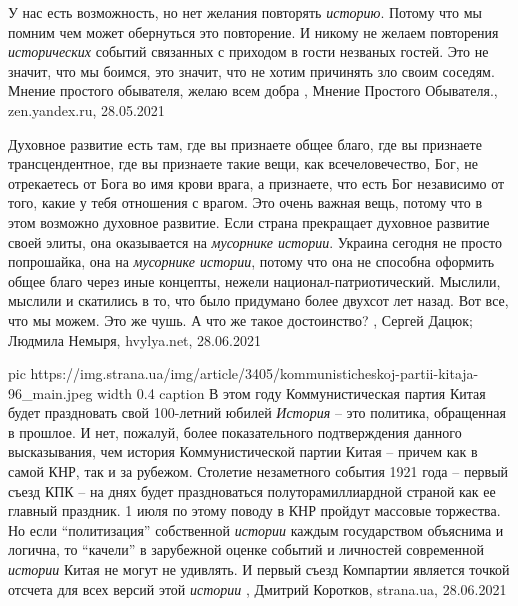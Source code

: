У нас есть возможность, но нет желания повторять \emph{историю}. Потому что мы помним
чем может обернуться это повторение. И никому не желаем повторения \emph{исторических}
событий связанных с приходом в гости незваных гостей. Это не значит, что мы
боимся, это значит, что не хотим причинять зло своим соседям.  Мнение простого
обывателя, желаю всем добра
, 
Мнение Простого Обывателя., zen.yandex.ru, 28.05.2021


Духовное развитие есть там, где вы признаете общее благо, где вы признаете
трансцендентное, где вы признаете такие вещи, как всечеловечество, Бог, не
отрекаетесь от Бога во имя крови врага, а признаете, что есть Бог независимо от
того, какие у тебя отношения с врагом. Это очень важная вещь, потому что в этом
возможно духовное развитие. Если страна прекращает духовное развитие своей
элиты, она оказывается на \emph{мусорнике истории}.  Украина сегодня не просто
попрошайка, она на \emph{мусорнике истории}, потому что она не способна оформить общее
благо через иные концепты, нежели национал-патриотический. Мыслили, мыслили и
скатились в то, что было придумано более двухсот лет назад. Вот все, что мы
можем. Это же чушь. А что же такое достоинство?
, 
Сергей Дацюк; Людмила Немыря, hvylya.net, 28.06.2021

\ifcmt
  pic https://img.strana.ua/img/article/3405/kommunisticheskoj-partii-kitaja-96_main.jpeg
  width 0.4
	caption В этом году Коммунистическая партия Китая будет праздновать свой 100-летний юбилей
\fi
\emph{История} – это политика, обращенная в прошлое. И нет, пожалуй, более
показательного подтверждения данного высказывания, чем история Коммунистической
партии Китая – причем как в самой КНР, так и за рубежом.  Столетие незаметного
события 1921 года – первый съезд КПК – на днях будет праздноваться
полуторамиллиардной страной как ее главный праздник. 1 июля по этому поводу в
КНР пройдут массовые торжества.  Но если \enquote{политизация} собственной
\emph{истории} каждым государством объяснима и логична, то \enquote{качели} в
зарубежной оценке событий и личностей современной \emph{истории} Китая не могут не
удивлять.  И первый съезд Компартии является точкой отсчета для всех версий
этой \emph{истории}
, 
Дмитрий Коротков, strana.ua, 28.06.2021

